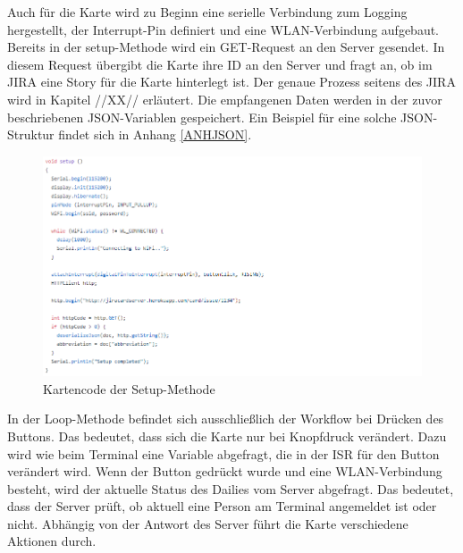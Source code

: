 \documentclass[12pt,titlepage]{scrartcl}
\begin{document}
		\noindent Auch für die Karte wird zu Beginn eine serielle Verbindung zum Logging hergestellt, der Interrupt-Pin definiert und eine WLAN-Verbindung aufgebaut. Bereits in der setup-Methode wird ein GET-Request an den Server gesendet. In diesem Request übergibt die Karte ihre ID an den Server und fragt an, ob im JIRA eine Story für die Karte hinterlegt ist. Der genaue Prozess seitens des JIRA wird in Kapitel //XX// erläutert. Die empfangenen Daten werden in der zuvor beschriebenen JSON-Variablen gespeichert. Ein Beispiel für eine solche JSON-Struktur findet sich in Anhang \ref{ANHJSON}. \\
		\begin{figure}[H] 
  			\centering
    		\includegraphics[height=0.5\textheight]{storySetup}
  			\caption{Kartencode der Setup-Methode}
  			\label{fig:storySetup}
		\end{figure}
		\noindent In der Loop-Methode befindet sich ausschließlich der Workflow bei Drücken des Buttons. Das bedeutet, dass sich die Karte nur bei Knopfdruck verändert. Dazu wird wie beim Terminal eine Variable abgefragt, die in der ISR für den Button verändert wird. Wenn der Button gedrückt wurde und eine WLAN-Verbindung besteht, wird der aktuelle Status des Dailies vom Server abgefragt. Das bedeutet, dass der Server prüft, ob aktuell eine Person am Terminal angemeldet ist oder nicht. Abhängig von der Antwort des Server führt die Karte verschiedene Aktionen durch. \\
\end{document}
